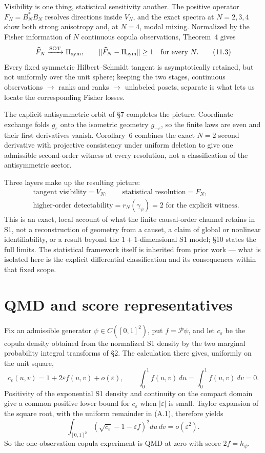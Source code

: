 \documentclass[11pt]{article}
\begin{document}
Visibility is one thing, statistical sensitivity another. The positive operator \(F_N=B_N^*B_N\) resolves directions inside \(V_N\), and the exact spectra at \(N=2,3,4\) show both strong anisotropy and, at \(N=4\), modal mixing. Normalized by the Fisher information of \(N\) continuous copula observations, Theorem~4 gives \[ \widehat F_N\xrightarrow{\rm SOT}\Pi_{\rm sym}, \qquad \|\widehat F_N-\Pi_{\rm sym}\|\ge1 \quad\text{for every }N. \tag{11.3} \] Every fixed symmetric Hilbert--Schmidt tangent is asymptotically retained, but not uniformly over the unit sphere; keeping the two stages, continuous observations \(\to\) ranks and ranks \(\to\) unlabeled posets, separate is what lets us locate the corresponding Fisher losses.

The explicit antisymmetric orbit of \S7 completes the picture. Coordinate exchange folds \(g_\varepsilon\) onto the isometric geometry \(g_{-\varepsilon}\), so the finite laws are even and their first derivatives vanish. Corollary~6 combines the exact \(N=2\) second derivative with projective consistency under uniform deletion to give one admissible second-order witness at every resolution, not a classification of the antisymmetric sector.

Three layers make up the resulting picture: \[ \boxed{\begin{aligned} &\text{tangent visibility}=V_N, \qquad \text{statistical resolution}=F_N,\\ &\text{higher-order detectability}=r_N(\gamma_\psi)=2 \text{ for the explicit witness}. \end{aligned}} \tag{11.4} \] This is an exact, local account of what the finite causal-order channel retains in S1, not a reconstruction of geometry from a causet, a claim of global or nonlinear identifiability, or a result beyond the \(1+1\)-dimensional S1 model; \S10 states the full limits. The statistical framework itself is inherited from prior work --- what is isolated here is the explicit differential classification and its consequences within that fixed scope.

\appendix

\section{QMD and score representatives}

Fix an admissible generator \(\psi\in C([0,1]^2)\), put \(f=\mathcal P\psi\), and let \(c_\varepsilon\) be the copula density obtained from the normalized S1 density by the two marginal probability integral transforms of \S2. The calculation there gives, uniformly on the unit square, \[ c_\varepsilon(u,v) =1+2\varepsilon f(u,v)+o(\varepsilon), \qquad \int_0^1f(u,v)\,du= \int_0^1f(u,v)\,dv=0. \tag{A.1} \] Positivity of the exponential S1 density and continuity on the compact domain give a common positive lower bound for \(c_\varepsilon\) when \(|\varepsilon|\) is small. Taylor expansion of the square root, with the uniform remainder in (A.1), therefore yields \[ \int_{[0,1]^2} \left( \sqrt{c_\varepsilon}-1-\varepsilon f \right)^2du\,dv=o(\varepsilon^2). \tag{A.2} \] So the one-observation copula experiment is QMD at zero with score \(2f=h_\psi\).
\end{document}
